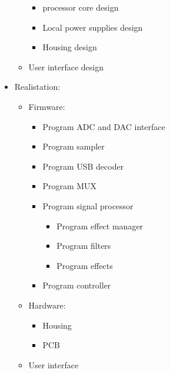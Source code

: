 \begin{itemize}
\begin{itemize}
\begin{itemize}
            \item processor core design
            \item Local power supplies design
            \item Housing design
        \end{itemize}
        \item User interface design
    \end{itemize}
    \item Realistation:
    \begin{itemize}
        \setlength\itemsep{-0.2em}
        \item Firmware:
        \begin{itemize}
            \setlength\itemsep{-0.2em}
            \item Program ADC and DAC interface
            \item Program sampler
            \item Program USB decoder
            \item Program MUX
            \item Program signal processor
            \begin{itemize}
                \setlength\itemsep{-0.2em}
                \item Program effect manager
                \item Program filters
                \item Program effects
            \end{itemize}
            \item Program controller
        \end{itemize}
        \item Hardware:
        \begin{itemize}
            \setlength\itemsep{-0.2em}
            \item Housing
            \item PCB
        \end{itemize}
        \item User interface
    \end{itemize}
\end{itemize}
